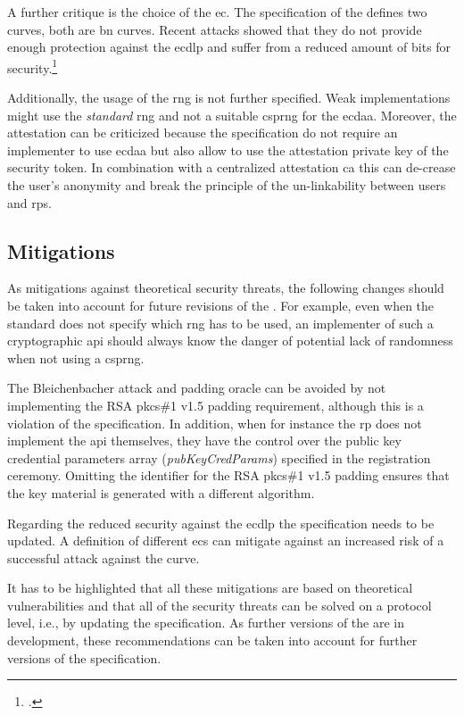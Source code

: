 A further critique is the choice of the \gls{ec}. The specification of the \wa{} defines two curves, both are \gls{bn} curves. Recent attacks showed that they do not provide enough protection against the \gls{ecdlp} and suffer from a reduced amount of bits for security.\footcites[See][562]{10.1007/978-3-662-53018-4_20}

Additionally, the usage of the \gls{rng} is not further specified. Weak implementations might use the \textit{standard} \gls{rng} and not a suitable \gls{csprng} for the \gls{ecdaa}. Moreover, the attestation can be criticized because the specification do not require an implementer to use \gls{ecdaa} but also allow to use the attestation private key of the security token. In combination with a centralized attestation \gls{ca} this can de-crease the user's anonymity and break the principle of the un-linkability between users and \glspl{rp}.

\subsection{Mitigations}

As mitigations against theoretical security threats, the following changes should be taken into account for future revisions of the \wa{}. For example, even when the standard does not specify which \gls{rng} has to be used, an implementer of such a cryptographic \gls{api} should always know the danger of potential lack of randomness when not using a \gls{csprng}. 

The Bleichenbacher attack and padding oracle can be avoided by not implementing the RSA \gls{pkcs}\#1 v1.5 padding requirement, although this is a violation of the specification. In addition, when for instance the \gls{rp} does not implement the \gls{api} themselves, they have the control over the public key credential parameters array (\textit{pubKeyCredParams}) specified in the registration ceremony. Omitting the identifier for the RSA \gls{pkcs}\#1 v1.5 padding ensures that the key material is generated with a different algorithm.

Regarding the reduced security against the \gls{ecdlp} the specification needs to be updated. A definition of different \glspl{ec} can mitigate against an increased risk of a successful attack against the curve.

It has to be highlighted that all these mitigations are based on theoretical vulnerabilities and that all of the security threats can be solved on a protocol level, i.e., by updating the specification. As further versions of the \wa{} are in development, these recommendations can be taken into account for further versions of the specification.
